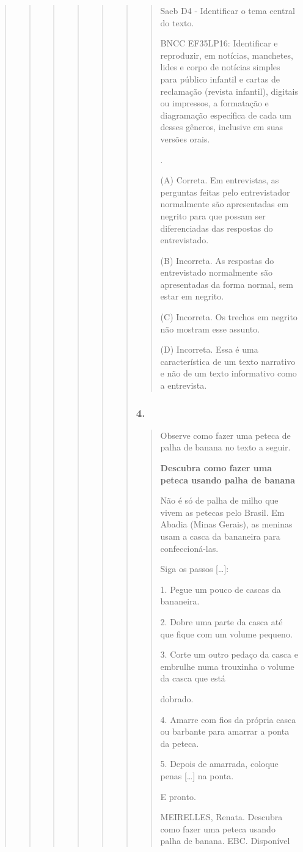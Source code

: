 \begin{quote}
\begin{quote}
\begin{quote}
\begin{quote}
\begin{quote}
\begin{quote}
\begin{quote}
Saeb D4 - Identificar o tema central do texto.

BNCC EF35LP16: Identificar e reproduzir, em notícias, manchetes, lides e
corpo de notícias simples para público infantil e cartas de reclamação
(revista infantil), digitais ou impressos, a formatação e diagramação
específica de cada um desses gêneros, inclusive em suas versões orais.

.

(A) Correta. Em entrevistas, as perguntas feitas pelo entrevistador
normalmente são apresentadas em negrito para que possam ser
diferenciadas das respostas do entrevistado.

(B) Incorreta. As respostas do entrevistado normalmente são apresentadas
da forma normal, sem estar em negrito.

(C) Incorreta. Os trechos em negrito não mostram esse assunto.

(D) Incorreta. Essa é uma característica de um texto narrativo e não de
um texto informativo como a entrevista.
\end{quote}

\subsubsection{4. }\label{section-87}

\begin{quote}
Observe como fazer uma peteca de palha de banana no texto a seguir.

\textbf{Descubra como fazer uma peteca usando palha de banana}

Não é só de palha de milho que vivem as petecas pelo Brasil. Em Abadia
(Minas Gerais), as meninas usam a casca da bananeira para
confeccioná-las.

Siga os passos {[}\ldots{}{]}:

1. Pegue um pouco de cascas da bananeira.

2. Dobre uma parte da casca até que fique com um volume pequeno.

3. Corte um outro pedaço da casca e embrulhe numa trouxinha o volume da
casca que está

dobrado.

4. Amarre com fios da própria casca ou barbante para amarrar a ponta da
peteca.

5. Depois de amarrada, coloque penas {[}\ldots{}{]} na ponta.

E pronto.

MEIRELLES, Renata. Descubra como fazer uma peteca usando palha de
banana. EBC. Disponível


\end{quote}
\end{quote}
\end{quote}
\end{quote}
\end{quote}
\end{quote}
\end{quote}
